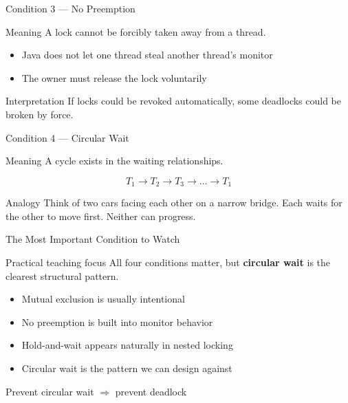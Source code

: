 \documentclass[aspectratio=169,11pt]{beamer}
\begin{document}
	\begin{frame}{Condition 3 --- No Preemption}
		\begin{block}{Meaning}
			A lock cannot be forcibly taken away from a thread.
		\end{block}
		
		\bigskip
		
		\begin{itemize}
			\item Java does not let one thread steal another thread’s monitor
			\item The owner must release the lock voluntarily
		\end{itemize}
		
		\bigskip
		
		\begin{alertblock}{Interpretation}
			If locks could be revoked automatically, some deadlocks could be broken by force.
		\end{alertblock}
	\end{frame}
	
	\begin{frame}{Condition 4 --- Circular Wait}
		\begin{block}{Meaning}
			A cycle exists in the waiting relationships.
		\end{block}
		
		\bigskip
		
		\[
		T_1 \rightarrow T_2 \rightarrow T_3 \rightarrow \dots \rightarrow T_1
		\]
		
		\bigskip
		
		\begin{alertblock}{Analogy}
			Think of two cars facing each other on a narrow bridge.  
			Each waits for the other to move first. Neither can progress.
		\end{alertblock}
	\end{frame}
	
	\begin{frame}{The Most Important Condition to Watch}
		\begin{block}{Practical teaching focus}
			All four conditions matter, but \textbf{circular wait} is the clearest structural pattern.
		\end{block}
		
		\bigskip
		
		\begin{itemize}
			\item Mutual exclusion is usually intentional
			\item No preemption is built into monitor behavior
			\item Hold-and-wait appears naturally in nested locking
			\item Circular wait is the pattern we can design against
		\end{itemize}
		
		\bigskip
		
		\centering
		\Large Prevent circular wait \(\Rightarrow\) prevent deadlock
	\end{frame}
	
\end{document}
